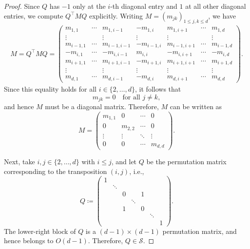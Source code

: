 \documentclass[10pt,a4paper]{amsart}
\begin{document}
\begin{proof}
Since $Q$ has $-1$ only at the $i$-th diagonal entry and $1$ at all other
diagonal entries, we compute $Q^\top M Q$ explicitly.
Writing $M=(m_{jk})_{1\leq j,k\leq d}$, we have
\begin{align*}
M
= Q^\top M Q
= \begin{pmatrix}
  m_{1,1} & \cdots & m_{1,i-1} & -m_{1,i} & m_{1,i+1} & \cdots & m_{1,d} \\[4pt]
  \vdots  &        & \vdots    & \vdots   & \vdots    &        & \vdots \\[4pt]
  m_{i-1,1} & \cdots & m_{i-1,i-1} & -m_{i-1,i} & m_{i-1,i+1} & \cdots & m_{i-1,d} \\[6pt]
  -m_{i,1} & \cdots & -m_{i,i-1} & m_{i,i} & -m_{i,i+1} & \cdots & -m_{i,d} \\[6pt]
  m_{i+1,1} & \cdots & m_{i+1,i-1} & -m_{i+1,i} & m_{i+1,i+1} & \cdots & m_{i+1,d} \\[4pt]
  \vdots &        & \vdots & \vdots & \vdots &        & \vdots \\[4pt]
  m_{d,1} & \cdots & m_{d,i-1} & -m_{d,i} & m_{d,i+1} & \cdots & m_{d,d}
\end{pmatrix}.
\end{align*}
Since this equality holds for all $i \in \{2,\dots,d\}$, it follows that
\[
m_{jk}=0 \quad \text{for all } j\neq k,
\]
and hence $M$ must be a diagonal matrix.
Therefore, $M$ can be written as
\[
M=
\begin{pmatrix}
m_{1,1} & 0 & \cdots & 0 \\
0 & m_{2,2} & \cdots & 0 \\
\vdots & \vdots & \ddots & \vdots \\
0 & 0 & \cdots & m_{d,d}
\end{pmatrix}.
\]

Next, take $i,j \in \{2,\dots,d\}$ with $i \le j$, and let $Q$ be the permutation
matrix corresponding to the transposition $(i,j)$, i.e.,
\[
Q\coloneqq
\begin{pmatrix}
1 &        &        &        &        &        &        \\
  & \ddots &        &        &        &        &        \\
  &        & 0      &        & 1      &        &        \\
  &        &        & \ddots &        &        &        \\
  &        & 1      &        & 0      &        &        \\
  &        &        &        &        & \ddots &        \\
  &        &        &        &        &        & 1
\end{pmatrix}.
\]
The lower-right block of $Q$ is a $(d-1)\times(d-1)$ permutation matrix, and
hence belongs to $O(d-1)$.
Therefore, $Q \in \mathcal{S}$.


\end{proof}
\end{document}
